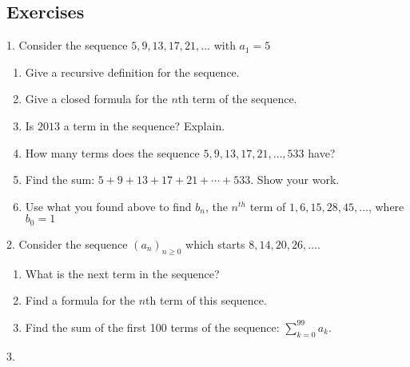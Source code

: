 \documentclass[10pt,]{book}
\theoremstyle{plain}
\theoremstyle{definition}
\theoremstyle{definition}
\theoremstyle{definition}
\theoremstyle{definition}
\numberwithin{equation}{chapter}
\begin{document}
\subsection[{Exercises}]{Exercises}\label{exercises_seq-arithgeom}
\begin{exerciselist}
\item[1.]\hypertarget{exercise-10}{}\hypertarget{p-173}{}%
Consider the sequence \(5, 9, 13, 17, 21, \ldots\) with \(a_1 = 5\)%
\par
\hypertarget{p-174}{}%
\leavevmode%
\begin{enumerate}[label=(\alph*)]
\item\hypertarget{li-97}{}\hypertarget{p-175}{}%
Give a recursive definition for the sequence.%
\item\hypertarget{li-98}{}\hypertarget{p-176}{}%
Give a closed formula for the \(n\)th term of the sequence.%
\item\hypertarget{li-99}{}\hypertarget{p-177}{}%
Is \(2013\) a term in the sequence? Explain.%
\item\hypertarget{li-100}{}\hypertarget{p-178}{}%
How many terms does the sequence \(5, 9, 13, 17, 21, \ldots, 533\) have?%
\item\hypertarget{li-101}{}\hypertarget{p-179}{}%
Find the sum: \(5 + 9 + 13 + 17 + 21 + \cdots + 533\). Show your work.%
\item\hypertarget{li-102}{}\hypertarget{p-180}{}%
Use what you found above to find \(b_n\), the \(n^{th}\) term of \(1, 6, 15, 28, 45, \ldots\), where \(b_0 = 1\)%
\end{enumerate}
%
\par\smallskip
\item[2.]\hypertarget{exercise-11}{}\hypertarget{p-184}{}%
Consider the sequence \((a_n)_{n \ge 0}\) which starts \(8, 14, 20, 26, \ldots\).%
\par
\hypertarget{p-185}{}%
\leavevmode%
\begin{enumerate}[label=(\alph*)]
\item\hypertarget{li-109}{}\hypertarget{p-186}{}%
What is the next term in the sequence?%
\item\hypertarget{li-110}{}\hypertarget{p-187}{}%
Find a formula for the \(n\)th term of this sequence.%
\item\hypertarget{li-111}{}\hypertarget{p-188}{}%
Find the sum of the first 100 terms of the sequence: \(\sum_{k=0}^{99}a_k\).%
\end{enumerate}
%
\par\smallskip
\item[3.]\hypertarget{exercise-12}{}\hypertarget{p-191}{}%

\end{exerciselist}
\end{document}
